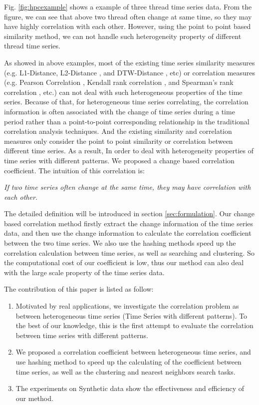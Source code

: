 Fig. \ref{fig:hpcexample} shows a example of three thread time series data. From the figure, we can see that above two thread often change at same time, so they may have highly correlation with each other. However, using the point to point based similarity method, we can not handle such heterogeneity property of different thread time series.


As showed in above examples, most of the existing time series similarity measures (e.g. L1-Distance, L2-Distance \cite{han2011data}, and DTW-Distance \cite{muller2007dynamic}, etc) or correlation measures (e.g. Pearson Correlation \cite{pearson1904mathematical}, Kendall rank correlation \cite{kendall1938new}, and Spearman's rank correlation \cite{pirie1988spearman}, etc.) can not deal with such heterogeneous properties of the time series. 
Because of that, for heterogeneous time series correlating, the correlation information is often associated with the change of time series during a time period rather than a point-to-point corresponding relationship in the traditional correlation analysis techniques. 
And the existing similarity and correlation measures only consider the point to point similarity or correlation between different time series.
As a result, In order to deal with heterogeneity properties of time series with different patterns. 
We proposed a change based correlation coefficient. 
The intuition of this correlation is: 

\textit{If two time series often change at the same time, they may have correlation with each other.} 

The detailed definition will be introduced in section \ref{sec:formulation}. 
Our change based correlation method firstly extract the change information of the time series data, and then use the change information to calculate the correlation coefficient between the two time series.
We also use the hashing methods speed up the correlation calculation between time series, as well as searching and clustering. 
So the computational cost of our coefficient is low, thus our method can also deal with the large scale property of the time series data.

The contribution of this paper is listed as follow:
\begin{enumerate}
\item Motivated by real applications, we investigate the correlation
problem as between heterogeneous time series (Time Series with different patterns).
To the best of our knowledge, this is the first attempt
to evaluate the correlation between time series with different patterns.

\item We proposed a correlation coefficient between heterogeneous time series, and 
use hashing method to speed up the calculating of the coefficient between time series, as well as the clustering and nearest neighbors search tasks.

\item The experiments on Synthetic data show the effectiveness and efficiency of our method.
\end{enumerate}

